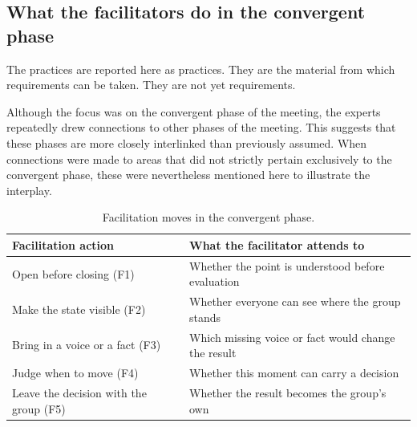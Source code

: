 \subsection{What the facilitators do in the convergent phase}
\label{sec:interview-facilitation-practice}

The practices are reported here as practices.
They are the material from which requirements can be taken.
They are not yet requirements.

Although the focus was on the convergent phase of the meeting, the experts repeatedly drew connections to
other phases of the meeting. This suggests that these phases are more closely interlinked than previously
assumed. When connections were made to areas that did not strictly pertain exclusively to the convergent
phase, these were nevertheless mentioned here to illustrate the interplay.

\begin{table}[htbp]
  \centering
  \caption{Facilitation moves in the convergent phase.}
  \label{tab:interview-facilitation-moves}
  \footnotesize
  \begin{tabularx}{\textwidth}{@{}>{\RaggedRight\arraybackslash}p{5.6cm}>{\RaggedRight\arraybackslash}X@{}}
    \toprule
    Facilitation action & What the facilitator attends to \\
    \midrule
    Open before closing (F1) & Whether the point is understood before evaluation \\
    Make the state visible (F2) & Whether everyone can see where the group stands \\
    Bring in a voice or a fact (F3) & Which missing voice or fact would change the result \\
    Judge when to move (F4) & Whether this moment can carry a decision \\
    Leave the decision with the group (F5) & Whether the result becomes the group's own \\
    \bottomrule
  \end{tabularx}
\end{table}

